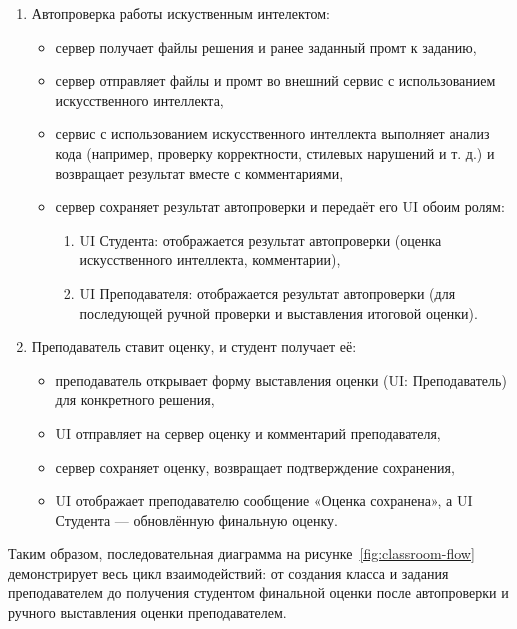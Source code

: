 \begin{enumerate}
    \item Автопроверка работы искуственным интелектом:
    \begin{itemize}
        \item сервер получает файлы решения и ранее заданный промт к заданию,
        \item сервер отправляет файлы и промт во внешний сервис с использованием искусственного интеллекта,
        \item сервис с использованием искусственного интеллекта выполняет анализ кода (например, проверку корректности, стилевых нарушений и т. д.) и возвращает результат вместе с комментариями,
        \item сервер сохраняет результат автопроверки и передаёт его UI обоим ролям:
        \begin{enumerate}
            \item UI Студента: отображается результат автопроверки (оценка искусственного интеллекта, комментарии),
            \item UI Преподавателя: отображается результат автопроверки (для последующей ручной проверки и выставления итоговой оценки).
        \end{enumerate}
    \end{itemize}

    \item Преподаватель ставит оценку, и студент получает её:
    \begin{itemize}
        \item преподаватель открывает форму выставления оценки (UI: Преподаватель) для конкретного решения,
        \item UI отправляет на сервер оценку и комментарий преподавателя,
        \item сервер сохраняет оценку, возвращает подтверждение сохранения,
        \item UI отображает преподавателю сообщение «Оценка сохранена», а UI Студента — обновлённую финальную оценку.
    \end{itemize}
\end{enumerate}

Таким образом, последовательная диаграмма на рисунке~\ref{fig:classroom-flow} демонстрирует весь цикл взаимодействий: от создания класса и задания преподавателем до получения студентом финальной оценки после автопроверки и ручного выставления оценки преподавателем.
